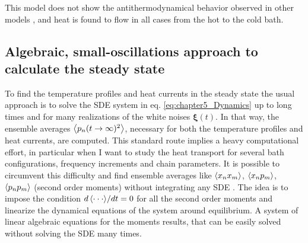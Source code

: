 This model does not show the antithermodynamical behavior  observed in other models
\cite{De-Chiara2018,Levy2014}, and heat is found to flow in all cases from the hot to the
cold bath.
%
%
%
\subsection{Algebraic, small-oscillations approach to calculate the steady state\label{sec:chapter5_steadyState}}
%
%
%
%
To find the temperature profiles and heat currents in the steady state the usual approach is to solve the SDE system in eq. \eqref{eq:chapter5_Dynamics} up to long times  and for many realizations of the white noises $\bm\xi (t)$. In that way, the ensemble averages $\expval{p_n(t \to \infty)^2}$, necessary for both the temperature profiles and heat currents, are computed. This standard route implies a heavy computational effort, in particular  when I want to study the heat transport for several bath configurations, frequency increments and chain parameters. It is possible to circumvent this difficulty and find ensemble averages like $\expval{x_n x_m}$, $\expval{x_n p_m}$, $\expval{p_n p_m}$ (second order moments) without integrating any SDE \cite{Sarkka2019,Rieder1967,Casher1971}. The idea is to impose the condition ${d\expval{\cdot\cdot\cdot}}/{dt} = 0$ for all the second order moments and linearize the dynamical equations of the system around equilibrium.
A system of linear algebraic equations for the moments results, that can be easily solved without solving the SDE many times.

